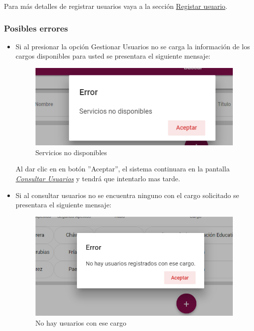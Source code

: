             Para más detalles de registrar usuarios vaya a la sección \hyperlink{registrar}{Registar usuario}.

        \subsubsection{Posibles errores}
    	  \begin{itemize}
            	\item Si al  presionar la opción Gestionar Usuarios no se carga la información de los cargos disponibles para usted se presentara el siguiente mensaje:

             \begin{figure}[!hbtp]
            	\centering
            	\includegraphics[width=0.4\linewidth]{images/SP5/MSGSN}
            	\caption{Servicios no disponibles}
            	\label{SND}

            \end{figure}

            		Al dar clic en en botón ''Aceptar'', el sistema continuara en la pantalla  \hyperlink{consultarUs}{\textit{Consultar Usuarios}} y tendrá que intentarlo  mas tarde.

           		\item Si al consultar usuarios no se encuentra ninguno con el cargo solicitado se presentara el siguiente mensaje:
           		 \begin{figure}[!hbtp]
           			\centering
           			\includegraphics[width=0.4\linewidth]{images/SP5/MSG21}
           			\caption{No hay usuarios con ese cargo}
           			\label{mensaje21}
           		\end{figure}

           \end{itemize}



